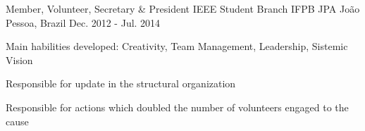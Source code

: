 \begin{cventries}
\cventry
  {Member, Volunteer, Secretary \& President} %
  {IEEE Student Branch IFPB JPA} %
  {João Pessoa, Brazil} %
  {Dec. 2012 - Jul. 2014} %
  {
    \begin{cvitems} %
      \item{Main habilities developed: Creativity, Team Management, Leadership, Sistemic Vision}
      \item{Responsible for update in the structural organization}
      \item{Responsible for actions which doubled the number of volunteers engaged to the cause}
    \end{cvitems}
  }
%
\end{cventries}
